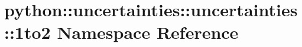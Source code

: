 \hypertarget{namespacepython_1_1uncertainties_1_1uncertainties_1_11to2}{
\section{python::uncertainties::uncertainties::1to2 Namespace Reference}
\label{namespacepython_1_1uncertainties_1_1uncertainties_1_11to2}
}
